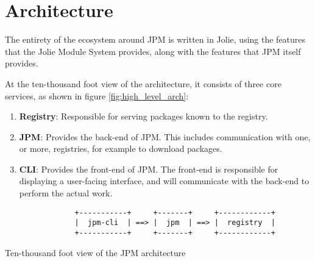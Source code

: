 
\section{Architecture}


The entirety of the ecosystem around JPM is written in Jolie, using the
features that the Jolie Module System provides, along with the features that
JPM itself provides.

At the ten-thousand foot view of the architecture, it consists of three
core services, as shown in figure \ref{fig:high_level_arch}:

\begin{enumerate}

\item \textbf{Registry}: Responsible for serving packages known to the
registry.

\item \textbf{JPM}: Provides the back-end of JPM. This includes communication
with one, or more, registries, for example to download packages.

\item \textbf{CLI}: Provides the front-end of JPM. The front-end is responsible
for displaying a user-facing interface, and will communicate with the back-end
to perform the actual work.

\end{enumerate}

\begin{listing}[H]
\begin{verbatim}
                +-----------+     +-------+     +------------+
                |  jpm-cli  | ==> |  jpm  | ==> |  registry  |
                +-----------+     +-------+     +------------+
\end{verbatim}
\caption{Ten-thousand foot view of the JPM architecture}
\label{fig:high_level_arch}
\end{listing}


